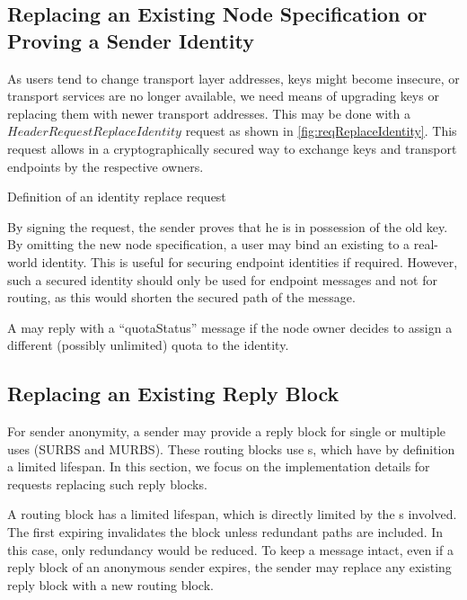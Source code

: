 \subsection{Replacing an Existing Node Specification or Proving a Sender Identity\label{sec:replaceID}}
As users tend to change transport layer addresses, keys might become insecure, or transport services are no longer available, we need means of upgrading keys or replacing them with newer transport addresses. This may be done with a $HeaderRequestReplaceIdentity$ request as shown in \cref{fig:reqReplaceIdentity}. This request allows in a cryptographically secured way to exchange keys and transport endpoints by the respective owners.

\begin{lstfloat}[ht]
	
	\caption{Definition of an identity replace request}
	\label{fig:reqReplaceIdentity}
\end{lstfloat}

By signing the request, the sender proves that he is in possession of the old key. By omitting the new node specification, a user may bind an existing  to a real-world identity. This is useful for securing endpoint identities if required. However, such a secured identity should only be used for endpoint messages and not for routing, as this would shorten the secured path of the message.

A \VortexNode{} may reply with a ``quotaStatus'' message if the node owner decides to assign a different (possibly unlimited) quota to the identity. 

\subsection{Replacing an Existing Reply Block\label{sec:replaceMURB}}
For sender anonymity, a sender may provide a reply block for single or multiple uses (SURBS and MURBS). These routing blocks use s, which have by definition a limited lifespan. In this section, we focus on the implementation details for requests replacing such reply blocks.

A routing block has a limited lifespan, which is directly limited by the s involved. The first expiring  invalidates the block unless redundant paths are included. In this case, only redundancy would be reduced. To keep a message intact, even if a reply block of an anonymous sender expires, the sender may replace any existing reply block with a new routing block.

